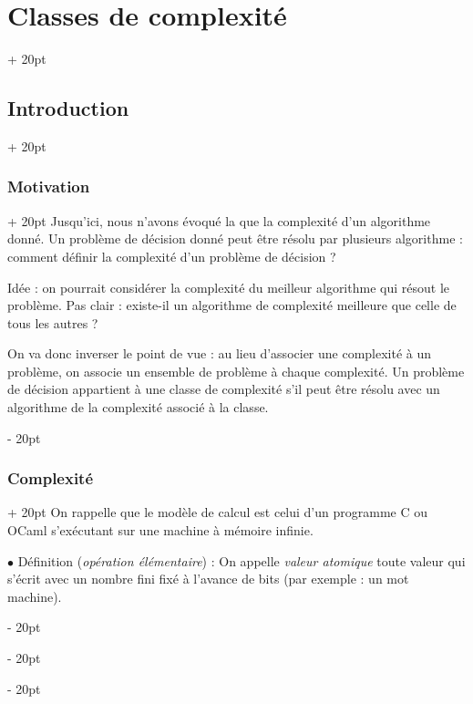 \documentclass[a4paper, 12pt, twoside]{article}
\newcommand{\ind}[1][20pt]{\advance\leftskip + #1}
\newcommand{\deind}[1][20pt]{\advance\leftskip - #1}
\newenvironment{indt}[2][20pt]{#2 \par \ind[#1]}{\par \deind} %
\begin{document}
    \begin{indt}{\section{Classes de complexité}}
        \begin{indt}{\subsection{Introduction}}
            \begin{indt}{\subsubsection{Motivation}}
                Jusqu'ici, nous n'avons évoqué la que la complexité d'un algorithme donné.
                Un problème de décision donné peut être résolu par plusieurs algorithme : comment définir la complexité d'un problème de décision ?

                Idée : on pourrait considérer la complexité du meilleur algorithme qui résout le problème.
                Pas clair : existe-il un algorithme de complexité meilleure que celle de tous les autres ?

                On va donc inverser le point de vue : au lieu d'associer une complexité à un problème, on associe un ensemble de problème à chaque complexité.
                Un problème de décision appartient à une classe de complexité s'il peut être résolu avec un algorithme de la complexité associé à la classe.
            \end{indt}

            \vspace{12pt}
            
            \begin{indt}{\subsubsection{Complexité}}
                On rappelle que le modèle de calcul est celui d'un programme C ou OCaml s'exécutant sur une machine à mémoire infinie.

                \vspace{12pt}
                
                $\bullet$ Définition (\textit{opération élémentaire}) :
                On appelle \emph{valeur atomique} toute valeur qui s'écrit avec un nombre fini fixé à l'avance de bits (par exemple : un mot machine).


\end{indt}
\end{indt}
\end{indt}
\end{document}

